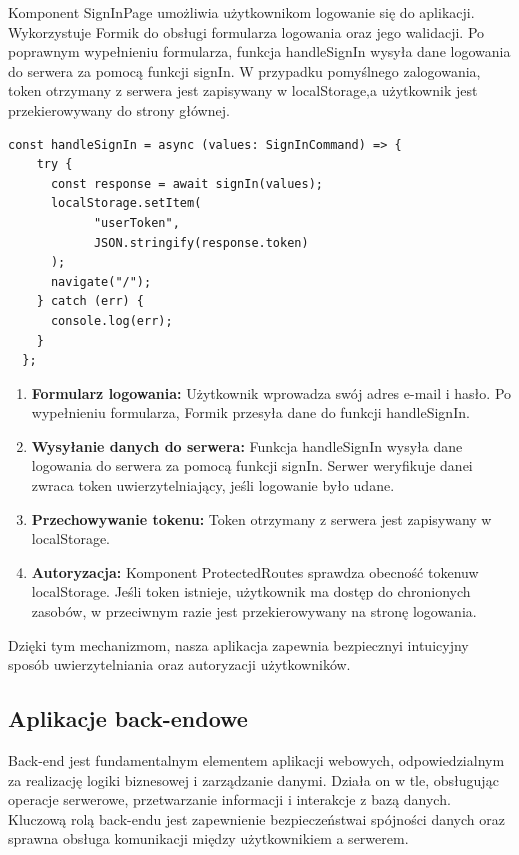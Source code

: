 
\noindent Komponent SignInPage umożliwia użytkownikom logowanie się do aplikacji. Wykorzystuje Formik do obsługi formularza logowania oraz jego walidacji. Po poprawnym wypełnieniu formularza, funkcja handleSignIn wysyła dane logowania do serwera za pomocą funkcji signIn. W przypadku pomyślnego zalogowania, token otrzymany z serwera jest zapisywany w localStorage,\linebreak a użytkownik jest przekierowywany do strony głównej.

\begin{lstlisting}[language=html, caption=handleSignIn example]
  const handleSignIn = async (values: SignInCommand) => {
    try {
      const response = await signIn(values);
      localStorage.setItem(
            "userToken",
            JSON.stringify(response.token)
      );
      navigate("/");
    } catch (err) {
      console.log(err);
    }
  };
\end{lstlisting}


\begin{enumerate}
    \item {\bf Formularz logowania:} Użytkownik wprowadza swój adres e-mail i hasło. Po wypełnieniu formularza, Formik przesyła dane do funkcji handleSignIn.
    \item {\bf Wysyłanie danych do serwera:} Funkcja handleSignIn wysyła dane logowania do serwera za pomocą funkcji signIn. Serwer weryfikuje dane\linebreak i zwraca token uwierzytelniający, jeśli logowanie było udane.
    \item {\bf Przechowywanie tokenu:} Token otrzymany z serwera jest zapisywany w localStorage.
    \item {\bf Autoryzacja:} Komponent ProtectedRoutes sprawdza obecność tokenu\linebreak w localStorage. Jeśli token istnieje, użytkownik ma dostęp do chronionych zasobów, w przeciwnym razie jest przekierowywany na stronę logowania.
\end{enumerate}

Dzięki tym mechanizmom, nasza aplikacja zapewnia bezpieczny\linebreak i intuicyjny sposób uwierzytelniania oraz autoryzacji użytkowników.

\clearpage

\subsection{Aplikacje back-endowe}
Back-end jest fundamentalnym elementem aplikacji webowych, odpowiedzialnym za realizację logiki biznesowej i zarządzanie danymi. Działa on w tle, obsługując operacje serwerowe, przetwarzanie informacji i interakcje z bazą danych. Kluczową rolą back-endu jest zapewnienie bezpieczeństwa\linebreak i spójności danych oraz sprawna obsługa komunikacji między użytkownikiem a serwerem.

